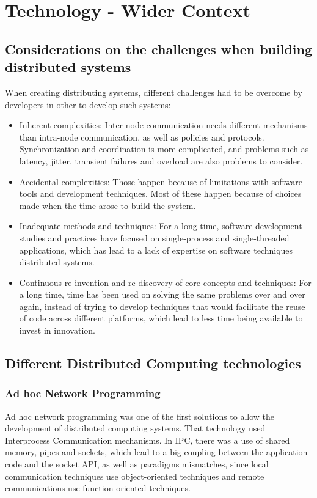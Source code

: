 \chapter{Technology - Wider Context}
\section{Considerations on the challenges when building distributed systems}
    When creating distributing systems, different challenges had to be overcome
    by developers in other to develop such systems:
    \begin{itemize}
        \item Inherent complexities: Inter-node communication needs different mechanisms
        than intra-node communication, as well as policies and protocols. Synchronization
        and coordination is more complicated, and problems such as latency, jitter,
        transient failures and overload are also problems to consider.
        \item Accidental complexities: Those happen because of limitations with
        software tools and development techniques. Most of these happen because
        of choices made when the time arose to build the system.
        \item Inadequate methods and techniques: For a long time, software development
        studies and practices have focused on single-process and single-threaded applications,
        which has lead to a lack of expertise on software techniques distributed systems.
        \item Continuous re-invention and re-discovery of core concepts and techniques:
        For a long time, time has been used on solving the same problems over and over
        again, instead of trying to develop techniques that would facilitate the reuse of
        code across different platforms, which lead to less time being available to invest in
        innovation.
    \end{itemize}

    \section{Different Distributed Computing technologies}
    \subsection{Ad hoc Network Programming}
    Ad hoc network programming was one of the first solutions to allow the development
    of distributed computing systems. That technology used Interprocess Communication mechanisms.
    In IPC, there was a use of shared memory, pipes and sockets, which lead to a big coupling between
    the application code and the socket API, as well as paradigms mismatches, since local communication
    techniques use object-oriented techniques and remote communications use function-oriented techniques.


